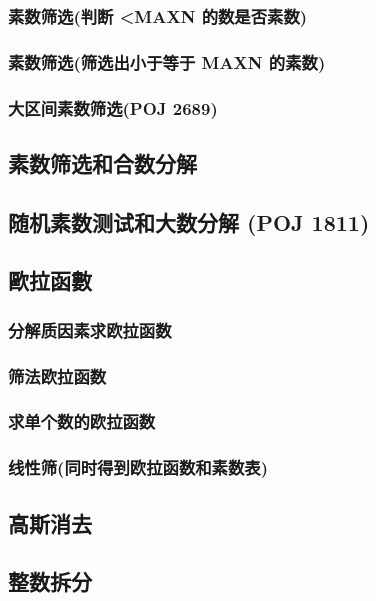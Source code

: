		\subsubsection{素数筛选(判断 <MAXN 的数是否素数)}
			
		\subsubsection{素数筛选(筛选出小于等于 MAXN 的素数)}
			
		\subsubsection{大区间素数筛选(POJ 2689)}
			
	\subsection{素数筛选和合数分解}
		
	\subsection{随机素数测试和大数分解 (POJ 1811)}
		
	\subsection{歐拉函數}
		\subsubsection{分解质因素求欧拉函数}
			
		\subsubsection{筛法欧拉函数}
			
		\subsubsection{求单个数的欧拉函数}
			
		\subsubsection{线性筛(同时得到欧拉函数和素数表)}
			
	\subsection{高斯消去}
		
	\subsection{整数拆分}
		
